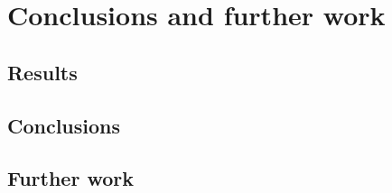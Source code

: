 \section{Conclusions and further work}
\label{sec:conc}

\subsection{Results}

\subsection{Conclusions}

\subsection{Further work}

